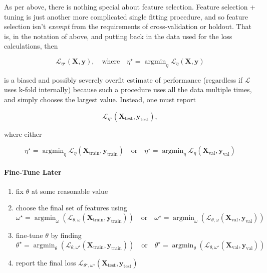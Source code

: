 \documentclass[10pt]{article}
\newcommand{\tsub}[2]{\mathbf{#1}_{\text{#2}}}
\DeclareMathOperator*{\argmin}{\arg\min}
\begin{document}
As per above, there is nothing special about feature selection. Feature selection + tuning is just another more complicated single fitting procedure, and so feature selection isn't \emph{exempt} from the requirements of cross-validation or holdout. That is, in the notation of above, and putting back in the data used for the loss calculations, then

\[
  \mathcal{L}_{\eta^{\star}}(\mathbf{X}, \mathbf{y}),
  \quad \text{where} \quad
  \eta^{\star} = \argmin_{\eta} \mathcal{L}_{\eta}(\mathbf{X}, \mathbf{y})
\]

is a biased and possibly severely overfit estimate of performance (regardless if \(\mathcal{L}\) uses k-fold internally) because such a procedure uses all the data multiple times, and simply chooses the largest value. Instead, one must report

\[
  \mathcal{L}_{\eta^{\star}}(\tsub{X}{test}, \tsub{y}{test}),
\]

where either

\[
  \eta^{\star} = \argmin_{\eta}  \mathcal{L}_{\eta}(\tsub{X}{train}, \tsub{y}{train})
  \quad \text{or} \quad
  \eta^{\star} = \argmin_{\eta} \mathcal{L}_{\eta}(\tsub{X}{val}, \tsub{y}{val})
\]




\paragraph{Fine-Tune Later}
\begin{enumerate}
\item fix \(\theta\) at some reasonable value
\item choose the final set of features using
\[
  \omega^{\star} = \argmin_{\omega} \left(\mathcal{L}_{\theta, \omega}(\tsub{X}{train}, \tsub{y}{train})\right)
  \quad \text{or} \quad
  \omega^{\star} = \argmin_{\omega} \left(\mathcal{L}_{\theta, \omega}(\tsub{X}{val}, \tsub{y}{val})\right)
\]
\item fine-tune \(\theta\) by finding
\[
  \theta^{\star} = \argmin_{\theta} \left(\mathcal{L}_{\theta, \omega^{\star}}(\tsub{X}{train}, \tsub{y}{train})\right)
  \quad \text{or} \quad
  \theta^{\star} = \argmin_{\theta} \left(\mathcal{L}_{\theta, \omega^{\star}}(\tsub{X}{val}, \tsub{y}{val})\right)
\]
\item report the final loss \(\mathcal{L}_{\theta^{\star}, \omega^{\star}}(\tsub{X}{test}, \tsub{y}{test})\)
\end{enumerate}
\end{document}
